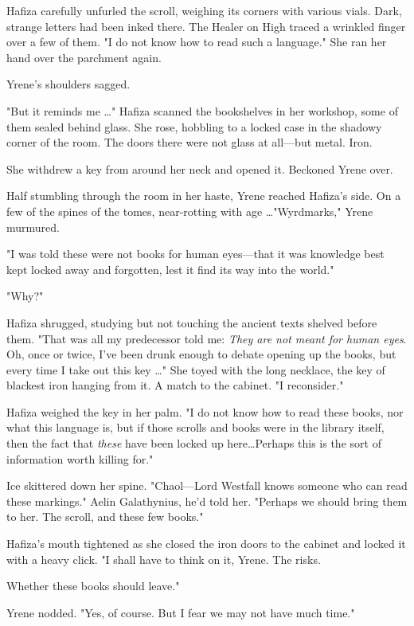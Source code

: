 Hafiza carefully unfurled the scroll, weighing its corners with various vials.
Dark, strange letters had been inked there.
The Healer on High traced a wrinkled finger over a few of them.
"I do not know how to read such a language."
She ran her hand over the parchment again.

Yrene's shoulders sagged.

"But it reminds me \ldots" Hafiza scanned the bookshelves in her workshop, some of them sealed behind glass.
She rose, hobbling to a locked case in the shadowy corner of the room.
The doors there were not glass at all---but metal.
Iron.

She withdrew a key from around her neck and opened it.
Beckoned Yrene over.

Half stumbling through the room in her haste, Yrene reached Hafiza's side.
On a few of the spines of the tomes, near-rotting with age \ldots"Wyrdmarks," Yrene murmured.

"I was told these were not books for human eyes---that it was knowledge best kept locked away and forgotten, lest it find its way into the world."

"Why?"

Hafiza shrugged, studying but not touching the ancient texts shelved before them.
"That was all my predecessor told me: \emph{They are not meant for human eyes}.
Oh, once or twice, I've been drunk enough to debate opening up the books, but every time I take out this key \ldots" She toyed with the long necklace, the key of blackest iron hanging from it.
A match to the cabinet.
"I reconsider."

Hafiza weighed the key in her palm.
"I do not know how to read these books, nor what this language is, but if those scrolls and books were in the library itself, then the fact that \emph{these} have been locked up here\ldots Perhaps this is the sort of information worth killing for."

Ice skittered down her spine.
"Chaol---Lord Westfall knows someone who can read these markings."
Aelin Galathynius, he'd told her.
"Perhaps we should bring them to her.
The scroll, and these few books."

Hafiza's mouth tightened as she closed the iron doors to the cabinet and locked it with a heavy click.
"I shall have to think on it, Yrene.
The risks.

Whether these books should leave."

Yrene nodded.
"Yes, of course.
But I fear we may not have much time."


